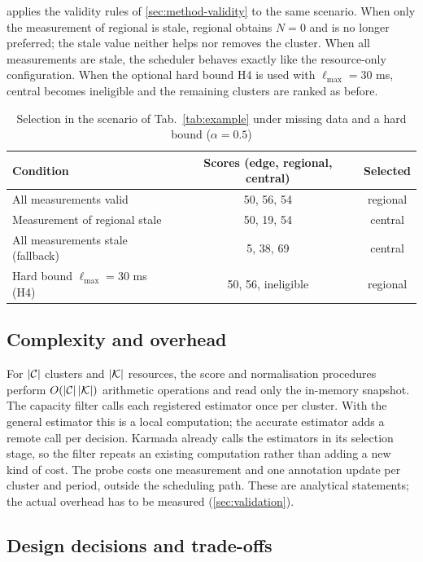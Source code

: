  applies the validity rules of \cref{sec:method-validity} to the same scenario. When only the measurement of regional is stale, regional obtains $N = 0$ and is no longer preferred; the stale value neither helps nor removes the cluster. When all measurements are stale, the scheduler behaves exactly like the resource-only configuration. When the optional hard bound H4 is used with $\ell_{\max} = 30$ ms, central becomes ineligible and the remaining clusters are ranked as before.

\begin{table}[t]
\caption{Selection in the scenario of Tab.~\ref*{tab:example} under missing data and a hard bound ($\alpha = 0.5$)}\label{tab:missing}
\centering\small{}
\begin{tabularx}{\textwidth}{@{}LCC@{}}
\toprule
\textbf{Condition} & \textbf{Scores (edge, regional, central)} & \textbf{Selected} \\
\midrule
All measurements valid & 50, 56, 54 & regional \\
Measurement of regional stale & 50, 19, 54 & central \\
All measurements stale (fallback) & 5, 38, 69 & central \\
Hard bound $\ell_{\max} = 30$ ms (H4) & 50, 56, ineligible & regional \\
\bottomrule
\end{tabularx}
\end{table}

\subsection{Complexity and overhead}\label{sec:analysis-complexity}

For $|\mathcal{C}|$ clusters and $|\mathcal{K}|$ resources, the score and normalisation procedures perform $O(|\mathcal{C}|\,|\mathcal{K}|)$ arithmetic operations and read only the in-memory snapshot. The capacity filter calls each registered estimator once per cluster. With the general estimator this is a local computation; the accurate estimator adds a remote call per decision. Karmada already calls the estimators in its selection stage, so the filter repeats an existing computation rather than adding a new kind of cost. The probe costs one measurement and one annotation update per cluster and period, outside the scheduling path. These are analytical statements; the actual overhead has to be measured (\cref{sec:validation}).

\subsection{Design decisions and trade-offs}\label{sec:analysis-tradeoffs}

